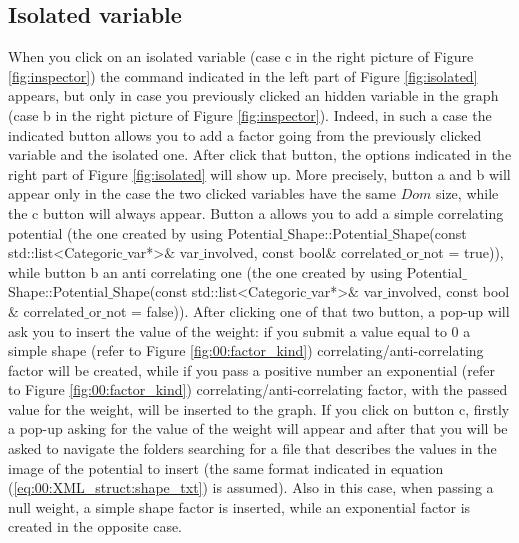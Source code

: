 \subsection{Isolated variable}
\label{sec:GUI:isolated}

When you click on an isolated variable (case c in the right picture of Figure \ref{fig:inspector}) the command indicated in the left part of Figure \ref{fig:isolated} appears, but only in case you previously clicked an hidden variable in the graph (case b in the right picture of Figure \ref{fig:inspector}). Indeed, in such a case the indicated button allows you to add a factor going from the previously clicked variable and the isolated one. After click that button, the options indicated in the right part of Figure \ref{fig:isolated} will show up. More precisely, button a and b will appear only in the case the two clicked variables have the same $Dom$ size, while the c button will always appear. Button a allows you to add a simple correlating potential (the one created by using Potential$\_$Shape::Potential$\_$Shape(const std::list<Categoric$\_$var*>$\&$ var$\_$involved, const bool$\&$ correlated$\_$or$\_$not = true)), while button b an anti correlating one (the one created by using Potential$\_$Shape::Potential$\_$Shape(const std::list<Categoric$\_$var*>$\&$ var$\_$involved, const bool$\&$ correlated$\_$or$\_$not = false)). After clicking one of that two button, a pop-up will ask you to insert the value of the weight: if you submit a value equal to 0 a simple shape (refer to Figure \ref{fig:00:factor_kind}) correlating/anti-correlating factor will be created, while if you pass a positive number an exponential (refer to Figure \ref{fig:00:factor_kind}) correlating/anti-correlating factor, with the passed value for the weight, will be inserted to the graph. If you click on button c, firstly a pop-up asking for the value of the weight will appear and after that you will be asked to navigate the folders searching for a file that describes the values in the image of the potential to insert (the same format indicated in equation (\ref{eq:00:XML_struct:shape_txt}) is assumed). Also in this case, when passing a null weight, a simple shape factor is inserted, while an exponential factor is created in the opposite case.


